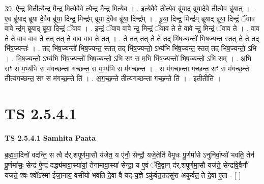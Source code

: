 \documentclass[17pt]{extarticle}
\begin{document}
39. ऐ॒न्द्र मितीत्यै॒न्द्र मै॒न्द्र मित्ये॒वैवे त्यै॒न्द्र मै॒न्द्र मित्ये॒व । . इत्ये॒वैवे तीत्ये॒व ब्रू॑याद् ब्रूयादे॒वे तीत्ये॒व ब्रू॑यात् । . ए॒व ब्रू॑याद् ब्रूया दे॒वैव ब्रू॑या॒ दिन्द्र॒ मिन्द्र॑म् ब्रूया दे॒वैव ब्रू॑या॒ दिन्द्र᳚म् । . ब्रू॒या॒ दिन्द्र॒ मिन्द्र॑म् ब्रूयाद् ब्रूया॒ दिन्द्रं॒ ॅवाव वावे न्द्र॑म् ब्रूयाद् ब्रूया॒ दिन्द्रं॒ ॅवाव । . इन्द्रं॒ ॅवाव वावे न्द्र॒ मिन्द्रं॒ ॅवाव ते ते वावे न्द्र॒ मिन्द्रं॒ ॅवाव ते । . वाव ते ते वाव वाव ते तत् तत् ते वाव वाव ते तत् । . ते तत् तत् ते ते तद् भि॑ष॒ज्यन्तो॑ भिष॒ज्यन्त॒ स्तत् ते ते तद् भि॑ष॒ज्यन्तः॑ । . तद् भि॑ष॒ज्यन्तो॑ भिष॒ज्यन्त॒ स्तत् तद् भि॑ष॒ज्यन्तो॒ ऽभ्य॑भि भि॑ष॒ज्यन्त॒ स्तत् तद् भि॑ष॒ज्यन्तो॒ ऽभि । . भि॒ष॒ज्यन्तो॒ ऽभ्य॑भि भि॑ष॒ज्यन्तो॑ भिष॒ज्यन्तो॒ ऽभि सꣳ स म॒भि भि॑ष॒ज्यन्तो॑ भिष॒ज्यन्तो॒ ऽभि सम् । . अ॒भि सꣳ स म॒भ्य॑भि स म॑गच्छन्ता गच्छन्त॒ स म॒भ्य॑भि स म॑गच्छन्त । . स म॑गच्छन्ता गच्छन्त॒ सꣳ स म॑गच्छ॒न्ते तीत्य॑गच्छन्त॒ सꣳ स म॑गच्छ॒न्ते ति॑ । . अ॒ग॒च्छ॒न्ते तीत्य॑गच्छन्ता गच्छ॒न्ते ति॑ । . इतीतीति॑ । \newline
\pagebreak
{}

\section{ TS 2.5.4.1 }

\textbf{TS 2.5.4.1 } \newline
\textbf{Samhita Paata} \newline

ब्र॒ह्म॒वा॒दिनो॑ वदन्ति॒ स त्वै द॑॑र्.शपूर्णमा॒सौ य॑जेत॒ य ए॑नौ॒ सेन्द्रौ॒ यजे॒तेति॑ वैमृ॒धः पू॒र्णमा॑से ऽनुनिर्वा॒प्यो॑ भवति॒ तेन॑ पू॒र्णमा॑सः॒ सेन्द्र॑ ऐ॒न्द्रं दद्ध्य॑मावा॒स्या॑यां॒ तेना॑मावा॒स्या॑ सेन्द्रा॒ य ए॒वं ॅवि॒द्वान् द॑र्.शपूर्णमा॒सौ यज॑ते॒ सेन्द्रा॑वे॒वैनौ॑ यजते॒ श्वः श्वो᳚ऽस्मा ईजा॒नाय॒ वसी॑यो भवति दे॒वा वै यद्-य॒ज्ञे ऽकु॑र्वत॒तदसु॑रा अकुर्वत॒ ते दे॒वा ए॒ता - [  ] \newline
\end{document}
